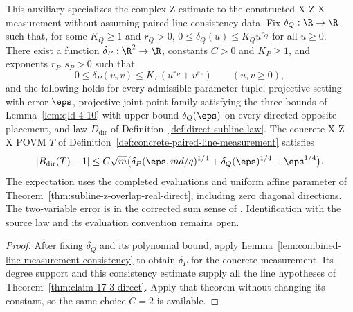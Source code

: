 \begin{theorem}
	\label{thm:claim-17-3-concrete-direct}
	\leanok
	This auxiliary specializes the complex Z estimate to the constructed
	X-Z-X measurement without assuming paired-line consistency data.
	Fix $\delta_Q:\R\to\R$ such that, for some $K_Q\ge1$ and $r_Q>0$,
	$0\le\delta_Q(u)\le K_Q u^{r_Q}$ for all $u\ge0$.
	There exist a function $\delta_P:\R^2\to\R$, constants $C>0$ and
	$K_P\ge1$, and exponents $r_P,s_P>0$ such that
	\[
		0\le\delta_P(u,v)\le K_P(u^{r_P}+v^{s_P})\qquad(u,v\ge0),
	\]
	and the following holds for every admissible parameter tuple, projective
	setting with error $\eps$, projective joint point family satisfying the
	three bounds of Lemma~\ref{lem:qld-4-10} with upper bound
	$\delta_Q(\eps)$ on every directed opposite placement, and law
	$D_{\mathrm{dir}}$ of Definition~\ref{def:direct-subline-law}.
	The concrete X-Z-X POVM $T$ of
	Definition~\ref{def:concrete-paired-line-measurement} satisfies
	\[
		|B_{\mathrm{dir}}(T)-1|\le C\sqrt m
		\bigl(\delta_P(\eps,md/q)^{1/4}
		+\delta_Q(\eps)^{1/4}+\eps^{1/4}\bigr).
	\]
	The expectation uses the completed evaluations and uniform affine
	parameter of Theorem~\ref{thm:subline-z-overlap-real-direct}, including
	zero diagonal directions. The two-variable error is in the corrected sum
	sense of \cite{gap:qpbt_pasting-product-error}. Identification with the
	source law and its evaluation convention remains open.
\end{theorem}
\begin{proof}
	\leanok
	After fixing $\delta_Q$ and its polynomial bound, apply
	Lemma~\ref{lem:combined-line-measurement-consistency} to obtain
	$\delta_P$ for the concrete measurement. Its degree support and this
	consistency estimate supply all the line hypotheses of
	Theorem~\ref{thm:claim-17-3-direct}. Apply that theorem without changing
	its constant, so the same choice $C=2$ is available.
\end{proof}

